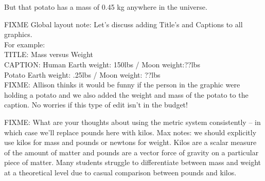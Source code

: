 But that potato has a mass of 0.45 kg anywhere in the universe.

FIXME Global layout note: Let's discuss adding Title's and Captions to all graphics.\\

For example:\\
TITLE: Mass versus Weight\\
CAPTION: Human Earth weight: 150lbs / Moon weight:??lbs\\
Potato Earth weight: .25lbs / Moon weight: ??lbs \\

FIXME:
Allison thinks it would be funny if the person in the graphic were holding a potato and we also added the weight and mass of the  potato to the caption. No worries if this type of edit isn't in the budget!

FIXME: What are your thoughts about using the metric system consistently -- in which case we'll replace pounds here with kilos. Max notes: we should explicitly use kilos for mass and pounds or newtons for weight. Kilos are a scalar measure of the amount of matter and pounds are a vector force of gravity on a particular piece of matter. Many students struggle to differentiate between mass and weight at a theoretical level due to casual comparison between pounds and kilos.
